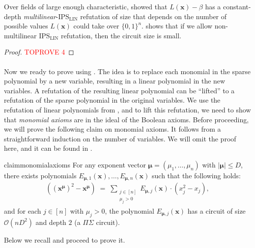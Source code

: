 \documentclass[11pt]{article}
\newcommand{\Boo}{\{0,1 \}}
\newcommand{\bigO}{\mathcal{O}}
\newcommand{\IPSLIN}{\mathrm{IPS}_{\mathrm{LIN}}}
\begin{document}
\noindent
Over fields of large enough characteristic, \cite[Proposition 4.15]{FSTW21} showed that $L(\mathbf{x})-\beta$ has a constant-depth \emph{multilinear}-$\IPSLIN$ refutation of size that depends on the number of possible values $L(\mathbf{x})$ could take over $\Boo^{n}$.  shows that if we allow non-multilinear $\IPSLIN$ refutation, then the circuit size is small.

\begin{proof}\textcolor{red}{TOPROVE 4}\end{proof}

\paragraph{}Now we ready to prove  using . The idea is to replace each monomial in the sparse polynomial by a new variable, resulting in a linear polynomial in the new variables. A refutation of the resulting linear polynomial can be ``lifted'' to a refutation of the sparse polynomial in the original variables. We use the refutation of linear polynomials from , and to lift this refutation, we need to show that \emph{monomial axioms} are in the ideal of the Boolean axioms. Before proceeding, we will prove the following claim on monomial axioms. It follows from a straightforward induction on the number of variables. We will omit the proof here, and it can be found in .\\


\begin{restatable}{claim}{monomialaxioms}\label{claim:monomial-axioms}
For any exponent vector $\bm{\mu} = (\mu_{1},\ldots,\mu_{n})$ with $|\bm{\mu}| \leq D$, there exists polynomials $E_{\bm{\mu},1}(\mathbf{x}), \ldots, E_{\bm{\mu},n}(\mathbf{x})$ such that the following holds:
\begin{align*}
    ((\mathbf{x}^{\bm{\mu}})^{2} - \mathbf{x}^{\bm{\mu}}) \; = \; \sum_{\substack{j \in [n] \\ \mu_{j} > 0}} E_{\bm{\mu},j}(\mathbf{x}) \cdot (x_{j}^{2} - x_{j}),
\end{align*}
and for each $j \in [n]$ with $\mu_{j} > 0$, the polynomial $E_{\bm{\mu},j}(\mathbf{x})$ has a circuit of size $\bigO(nD^{2})$ and depth $2$ (a $\Pi \Sigma$ circuit).
\end{restatable}

\noindent
Below we recall  and proceed to prove it.
\end{document}
